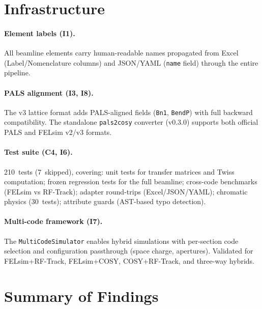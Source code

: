\documentclass[11pt]{article}
\begin{document}
\section{Infrastructure}
\label{sec:infrastructure}

\paragraph{Element labels (I1).}
All beamline elements carry human-readable names propagated from Excel
(Label/Nomenclature columns) and JSON/YAML (\texttt{name} field) through
the entire pipeline.

\paragraph{PALS alignment (I3, I8).}
The v3 lattice format adds PALS-aligned fields (\texttt{Bn1},
\texttt{BendP}) with full backward compatibility.  The standalone
\texttt{pals2cosy} converter (v0.3.0) supports both official PALS and
FELsim v2/v3 formats.

\paragraph{Test suite (C4, I6).}
210~tests (7~skipped), covering: unit tests for transfer matrices and
Twiss computation; frozen regression tests for the full beamline;
cross-code benchmarks (FELsim vs RF-Track); adapter round-trips
(Excel/JSON/YAML); chromatic physics (30~tests); attribute guards
(AST-based typo detection).

\paragraph{Multi-code framework (I7).}
The \texttt{MultiCodeSimulator} enables hybrid simulations with per-section
code selection and configuration passthrough (space charge, apertures).
Validated for FELsim+RF-Track, FELsim+COSY, COSY+RF-Track, and three-way
hybrids.


\section{Summary of Findings}
\label{sec:summary}
\end{document}
